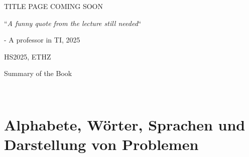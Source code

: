 \documentclass{article}
\begin{document}
\startDocument
\usetcolorboxes

\vspace{2cm}
\begin{Huge}
    \begin{center}
        TITLE PAGE COMING SOON
    \end{center}
\end{Huge}


\vspace{4cm}
\begin{center}
    \begin{Large}
        ``\textit{A funny quote from the lecture still needed}``
    \end{Large}

    \hspace{3cm} - A professor in TI, 2025
\end{center}

\vspace{3cm}
\begin{center}
    HS2025, ETHZ\\[0.2cm]
    \begin{Large}
        Summary of the Book
    \end{Large}\\[0.2cm]
\end{center}

\newpage


\newpage





\newsection
\section{Alphabete, Wörter, Sprachen und Darstellung von Problemen}



\end{document}
